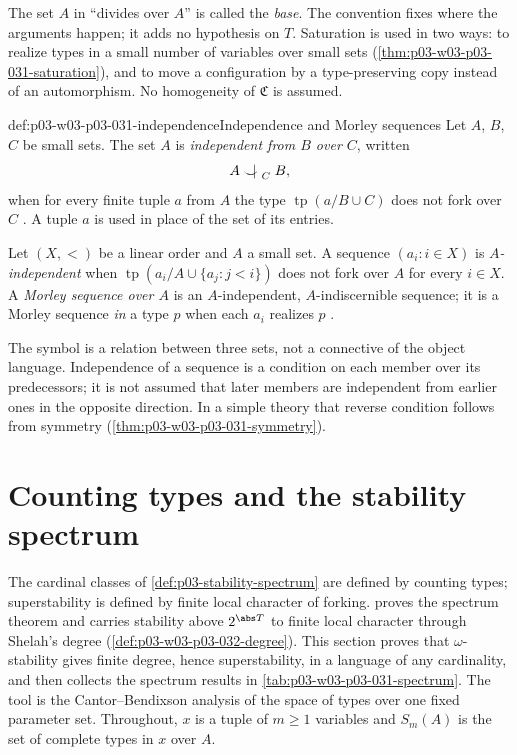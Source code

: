 The set \(A\) in ``divides over \(A\)'' is called the \emph{base}.  The
convention fixes where the arguments happen; it adds no hypothesis on
\(T\).  Saturation is used in two ways: to realize types in a small
number of variables over small sets
(\cref{thm:p03-w03-p03-031-saturation}), and to move a configuration by a
type-preserving copy instead of an automorphism.  No homogeneity of
\(\mathfrak C\) is assumed.

\begin{hbdefinition}{def:p03-w03-p03-031-independence}{Independence and Morley sequences}
Let \(A\), \(B\), \(C\) be small sets.  The set \(A\) is \emph{independent
from \(B\) over \(C\)}, written
\[
 A\mathrel{\raisebox{-0.3ex}{\(\smile\)}\mkern-11.5mu\mid\mkern6.5mu}_{C}B,
\]
when for every finite tuple \(a\) from \(A\) the type
\(\operatorname{tp}(a/B\cup C)\) does not fork over \(C\)
\cite[Definition~5.1, p.~271]{Casanovas2007Simplicity}.  A tuple \(a\) is
used in place of the set of its entries.

Let \((X,<)\) be a linear order and \(A\) a small set.  A sequence
\((a_i:i\in X)\) is \emph{\(A\)-independent} when
\(\operatorname{tp}(a_i/A\cup\{a_j:j<i\})\) does not fork over \(A\) for
every \(i\in X\).  A \emph{Morley sequence over \(A\)} is an
\(A\)-independent, \(A\)-indiscernible sequence; it is a Morley sequence
\emph{in} a type \(p\) when each \(a_i\) realizes \(p\)
\cite[Definition~5.2, p.~272]{Casanovas2007Simplicity}.
\end{hbdefinition}

The symbol is a relation between three sets, not a connective of the
object language.  Independence of a sequence is a condition on each member
over its predecessors; it is not assumed that later members are
independent from earlier ones in the opposite direction.  In a simple
theory that reverse condition follows from symmetry
(\cref{thm:p03-w03-p03-031-symmetry}).

\section{Counting types and the stability spectrum}
\label{sec:p03-w03-p03-031-spectrum}

The cardinal classes of \cref{def:p03-stability-spectrum} are defined by
counting types; superstability is defined by finite local character of
forking.   proves the spectrum theorem
and carries stability above \(2^{\abs T}\) to finite local character
through Shelah's degree (\cref{def:p03-w03-p03-032-degree}).  This section
proves that \(\omega\)-stability gives finite degree, hence
superstability, in a language of any cardinality, and then collects the
spectrum results in \cref{tab:p03-w03-p03-031-spectrum}.  The tool is the
Cantor--Bendixson analysis of the space of types over one fixed parameter
set.  Throughout, \(x\) is a tuple of \(m\geq1\) variables and
\(S_m(A)\) is the set of complete types in \(x\) over \(A\).

